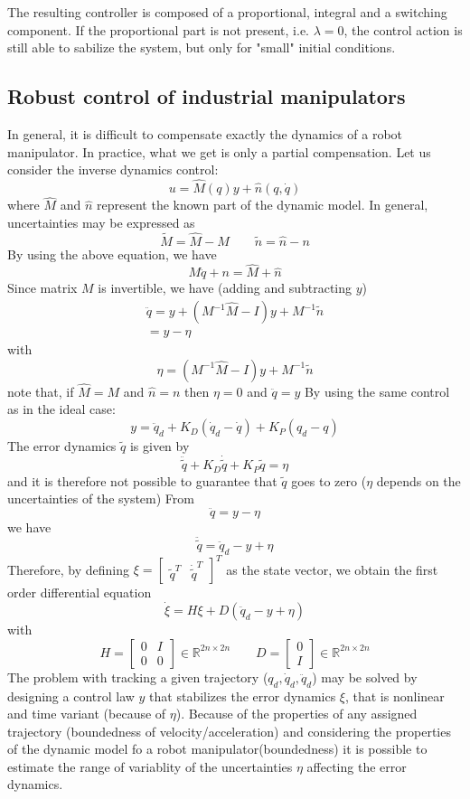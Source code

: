 \documentclass{book}
\begin{document}
The resulting controller is composed of a proportional, integral and a switching component. If the proportional part is not present, i.e. $\lambda = 0$, the control action is still able to sabilize the system, but only for "small" initial conditions. 

\subsection{Robust control of industrial manipulators}
In general, it is difficult to compensate exactly the dynamics of a robot manipulator. In practice, what we get is only a partial compensation. Let us consider the inverse dynamics control:
\[
    u=\hat{M}(q)y+\hat{n}(q,\dot{q})
\]
where $\hat{M}$ and $\hat{n}$ represent the known part of the dynamic model. In general, uncertainties may be expressed as 
\[
    \tilde{M}=\hat{M}-M \qquad \tilde{n} = \hat{n} - n
\]
By using the above equation, we have
\[
    M\ddot{q}+n=\hat{M}+\hat{n}
\]
Since matrix $M$ is invertible, we have (adding and subtracting $y$)
\begin{gather*}
    \ddot{q} = y + (M^{-1}\hat{M}-I)y+M^{-1}\tilde{n}\\
    =y-\eta
\end{gather*}
with
\[
    \eta = (M^{-1}\hat{M}-I)y+M^{-1}\tilde{n}
\]
note that, if $\hat{M}=M$ and $\hat{n}=n$ then $\eta=0$ and $\ddot{q}=y$
By using the same control as in the ideal case:
\[
    y=\ddot{q}_d+K_D(\dot{q}_d-\dot{q})+K_P(q_d-q)
\]
The error dynamics $\tilde{q}$ is given by 
\[
    \ddot{\tilde{q}}+K_D\dot{\tilde{q}} + K_P\tilde{q}=\eta
\]
and it is therefore not possible to guarantee that $\tilde{q}$ goes to zero ($\eta$ depends on the uncertainties of the system)
From
\[
    \ddot{q}=y-\eta
\]
we have 
\[
    \ddot{\tilde{q}}=\ddot{q}_d-y+\eta
\]
Therefore, by defining $\xi = \begin{bmatrix}
    \tilde{q}^T  & \dot{\tilde{q}}^T
\end{bmatrix}^T $ as the state vector, we obtain the first order differential equation
\[
    \dot{\xi} = H\xi + D(\ddot{q}_d-y+\eta)
\]
with
\[
    H=\begin{bmatrix}
        0 & I \\ 0 & 0
    \end{bmatrix} \in \mathbb{R}^{2n\times 2n} \qquad D = \begin{bmatrix}
        0 \\ I
    \end{bmatrix} \in \mathbb{R}^{2n\times 2n}
\]
The problem with tracking a given trajectory ($q_d,\dot{q}_d,\ddot{q}_d$) may be solved by designing a control law $y$ that stabilizes the error dynamics $\xi$, that is nonlinear and time variant (because of $\eta$). Because of the properties of any assigned trajectory (boundedness of velocity/acceleration) and considering the properties of the dynamic model fo a robot manipulator(boundedness) it is possible to estimate the range of variablity of the uncertainties $\eta$ affecting the error dynamics. 
\end{document}
